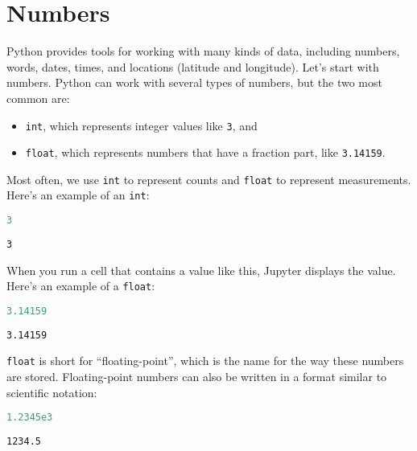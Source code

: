 \documentclass[
]{book}
\newcommand{\passthrough}[1]{#1}
\begin{document}
\section{Numbers}\label{numbers}

Python provides tools for working with many kinds of data, including
numbers, words, dates, times, and locations (latitude and longitude).
Let's start with numbers. Python can work with several types of numbers,
but the two most common are:

\begin{itemize}
\item
  \passthrough{\lstinline!int!}, which represents integer values like
  \passthrough{\lstinline!3!}, and
\item
  \passthrough{\lstinline!float!}, which represents numbers that have a
  fraction part, like \passthrough{\lstinline!3.14159!}.
\end{itemize}

Most often, we use \passthrough{\lstinline!int!} to represent counts and
\passthrough{\lstinline!float!} to represent measurements. Here's an
example of an \passthrough{\lstinline!int!}:

\begin{lstlisting}[language=Python]
3
\end{lstlisting}

\begin{lstlisting}
3
\end{lstlisting}

When you run a cell that contains a value like this, Jupyter displays
the value. Here's an example of a \passthrough{\lstinline!float!}:

\begin{lstlisting}[language=Python]
3.14159
\end{lstlisting}

\begin{lstlisting}
3.14159
\end{lstlisting}

\passthrough{\lstinline!float!} is short for ``floating-point'', which
is the name for the way these numbers are stored. Floating-point numbers
can also be written in a format similar to scientific notation:

\begin{lstlisting}[language=Python]
1.2345e3
\end{lstlisting}

\begin{lstlisting}
1234.5
\end{lstlisting}
\end{document}
